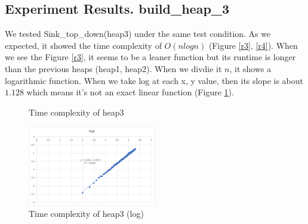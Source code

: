\documentclass[12pt]{article}
\begin{document}
\subsection{Experiment Results. build\_heap\_3}
We tested Sink\_top\_down(heap3) under the same test condition. 
As we expected, it showed the time complexity of $O(nlogn)$ ({Figure \ref{r3}, \ref{r4}}).
When we see the Figure \ref{r3}, it seems to be a leaner function but its runtime 
is longer than the previous heaps (heap1, heap2). When we divdie it $n$, it shows 
a logarithmic function. When we take log at each x, y value, then its slope is 
about $1.128$ which means it's not an exact linear function (Figure \ref{r5}).

\begin{figure}[hbt!]
  \centering
  \hfill
  \caption{Time complexity of heap3}
\end{figure}

\begin{figure}[hbt!]
  \centering
  \includegraphics[width=0.5\textwidth]{Figures/Sink_top_down3.png}
  \caption{Time complexity of heap3 (log)}
   \label{r5}
\end{figure}
\end{document}
